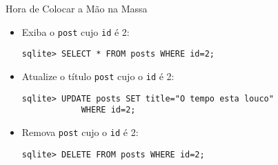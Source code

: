 \begin{frame}{Hora de Colocar a Mão na Massa}
\begin{itemize}
		\item Exiba o \verb|post| cujo \verb|id| é 2:
		\begin{lstlisting}[style=BashInputBasicStyle]
			sqlite> SELECT * FROM posts WHERE id=2;
		\end{lstlisting}
		
		\item Atualize o título \verb|post| cujo o \verb|id| é 2:
		\begin{lstlisting}[style=BashInputBasicStyle]
			sqlite> UPDATE posts SET title="O tempo esta louco" 
			WHERE id=2;
		\end{lstlisting}
		
		\item Remova \verb|post| cujo o \verb|id| é 2:
		\begin{lstlisting}[style=BashInputBasicStyle]
			sqlite> DELETE FROM posts WHERE id=2;
		\end{lstlisting}
	\end{itemize}
\end{frame}